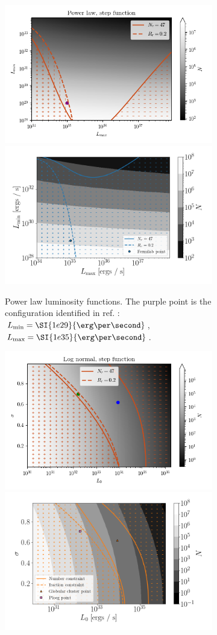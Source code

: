 \documentclass{C://Aliases//Dropbox-MIT//Latex_Templates//personal}
\begin{document}
\begin{figure}
    \centering
    \begin{subfigure}[t]{\textwidth}
        \centering
        \includegraphics[width=.48\linewidth]{figs/power-law/power-law-step.png}
        \hfill
        \includegraphics[width=.48\linewidth]{figs/power-law/power-law-pos-x1.png}
        \caption{Power law luminosity functions. The purple point is the configuration identified in ref. \cite{Zhong:2019ycb}: $L_\text{min}=\SI{1e29}{\erg\per\second}$, $L_\text{max} = \SI{1e35}{\erg\per\second}$.}
        \label{fig:power-law-contours-step}
    \end{subfigure}%
    \hfill
    \begin{subfigure}[t]{\textwidth}
        \centering
        \includegraphics[width=.48\linewidth]{figs/log-normal/log-normal-step.png}
        \hfill
        \includegraphics[width=.48\linewidth]{figs/log-normal/log-normal-pos-x1.png}

\end{subfigure}
\end{figure}
\end{document}
